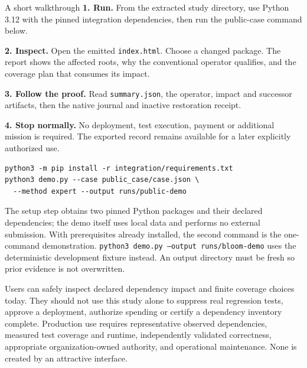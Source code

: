 \begin{evidencebox}{A short walkthrough}
\textbf{1. Run.} From the extracted study directory, use Python 3.12 with the pinned integration dependencies, then run the public-case command below.\par
\textbf{2. Inspect.} Open the emitted \texttt{index.html}. Choose a changed package. The report shows the affected roots, why the conventional operator qualifies, and the coverage plan that consumes its impact.\par
\textbf{3. Follow the proof.} Read \texttt{summary.json}, the operator, impact and successor artifacts, then the native journal and inactive restoration receipt.\par
\textbf{4. Stop normally.} No deployment, test execution, payment or additional mission is required. The exported record remains available for a later explicitly authorized use.
\end{evidencebox}
\begin{verbatim}
python3 -m pip install -r integration/requirements.txt
python3 demo.py --case public_case/case.json \
  --method expert --output runs/public-demo
\end{verbatim}
The setup step obtains two pinned Python packages and their declared dependencies; the demo itself uses local data and performs no external submission. With prerequisites already installed, the second command is the one-command demonstration. \texttt{python3 demo.py --output runs/bloom-demo} uses the deterministic development fixture instead. An output directory must be fresh so prior evidence is not overwritten.

Users can safely inspect declared dependency impact and finite coverage choices today. They should not use this study alone to suppress real regression tests, approve a deployment, authorize spending or certify a dependency inventory complete. Production use requires representative observed dependencies, measured test coverage and runtime, independently validated correctness, appropriate organization-owned authority, and operational maintenance. None is created by an attractive interface.

\FloatBarrier
